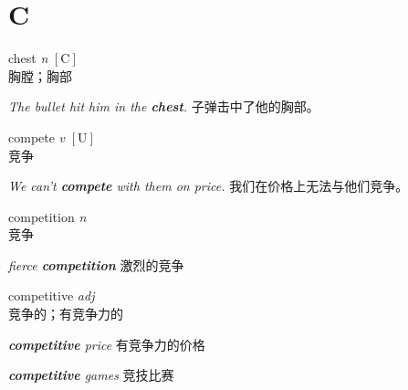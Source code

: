 \section{C}

\item[] {
    \lettrine{chest}{}  
    \textit{n} 
    $\mathrm{[C]}$ 
    \\
    胸膛；胸部

    \textit{The bullet hit him in the \textbf{chest}.}
    子弹击中了他的胸部。

} 

\item[] {
    \lettrine{compete}{}  
    \textit{v} 
    $\mathrm{[U]}$ 
    \\
    竞争

    \textit{We can't \textbf{compete} with them on price.}
    我们在价格上无法与他们竞争。

} 

\item[] {
    \lettrine{competition}{}  
    \textit{n} 
    \\
    竞争

    \textit{fierce \textbf{competition} }
    激烈的竞争

} 

\item[] {
    \lettrine{competitive}{}  
    \textit{adj} 
    \\
    竞争的；有竞争力的

    \textit{\textbf{competitive} price}
    有竞争力的价格

    \textit{\textbf{competitive} games}
    竞技比赛
} 